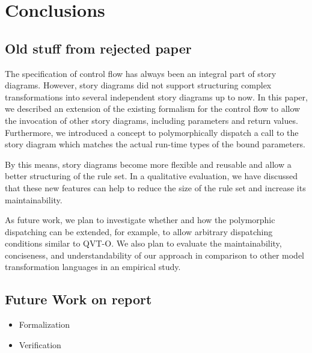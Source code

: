 \chapter{Conclusions}

\section*{Old stuff from rejected paper}

The specification of control flow has always been an integral part of story diagrams.
However, story diagrams did not support structuring complex transformations into several independent story diagrams up to now. 
In this paper, we described an extension of the existing formalism for the control flow to allow the invocation of other story diagrams, including parameters and return values.
Furthermore, we introduced a concept to polymorphically dispatch a call to the story diagram which matches the actual run-time types of the bound parameters. 

By this means, story diagrams become more flexible and reusable and allow a better structuring of the rule set. 
In a qualitative evaluation, we have discussed that these new features can help to reduce the size of the rule set and increase its maintainability.

As future work, we plan to investigate whether and how the polymorphic dispatching can be extended, for example, to allow arbitrary dispatching conditions similar to QVT-O.
We also plan to evaluate the maintainability, conciseness, and understandability of our approach in comparison to other model transformation languages in an empirical study.

\section{Future Work on report}
\begin{itemize}
  \item Formalization
  \item Verification
\end{itemize}